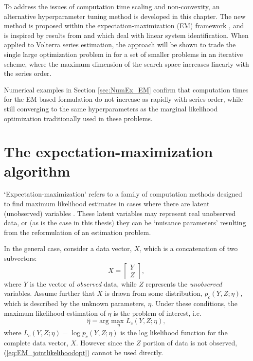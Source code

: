 To address the issues of computation time scaling and non-convexity, an alternative hyperparameter tuning method is developed in this chapter. The new method is proposed within the expectation-maximization (EM) framework \cite{Dempster1977}, and is inspired by results from \cite{Bottegal2015} and \cite{Bottegal2016} which deal with linear system identification. When applied to Volterra series estimation, the approach will be shown to trade the single large optimization problem in \cite{Birpoutsoukis2017} for a set of smaller problems in an iterative scheme, where the maximum dimension of the search space increases linearly with the series order. 

Numerical examples in Section \ref{sec:NumEx_EM} confirm that computation times for the EM-based formulation do not increase as rapidly with series order, while still converging to the same hyperparameters as the marginal likelihood optimization traditionally used in these problems.

\section{The expectation-maximization algorithm}

`Expectation-maximization' refers to a family of computation methods designed to find maximum likelihood estimates in cases where there are latent (unobserved) variables \cite{McLachlan2007}. These latent variables may represent real unobserved data, or (as is the case in this thesis) they can be `nuisance parameters' resulting from the reformulation of an estimation problem. 

In the general case, consider a data vector, $X$, which is a concatenation of two subvectors:
\begin{equation}
X = \begin{bmatrix} Y \\ Z \end{bmatrix},
\end{equation}
where $Y$ is the vector of \emph{observed} data, while $Z$ represents the \emph{unobserved} variables. Assume further that $X$ is drawn from some distribution, $p_c(Y,Z ; \eta)$, which is described by the unknown parameters, $\eta$. Under these conditions, the maximum likelihood estimation of $\eta$ is the problem of interest, i.e.
\begin{equation}
\hat{\eta} = \text{arg } \underset{\eta}{\text{max }} L_c(Y,Z ; \eta),
\label{eq:EM_jointlikelihoodopt}
\end{equation}
where $L_c(Y,Z ; \eta) = \log p_c(Y, Z; \eta)$ is the log likelihood function for the complete data vector, $X$. However since the $Z$ portion of data is not observed, (\ref{eq:EM_jointlikelihoodopt}) cannot be used directly.

